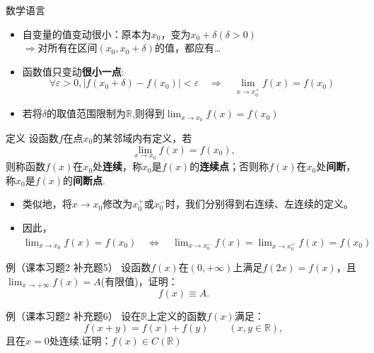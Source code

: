\documentclass[]{beamer}
\begin{document}
\begin{frame}{数学语言}
    \begin{itemize}
        \item 自变量的值变动很小：原本为$x_0$，变为$x_0+\delta(\delta>0)$\\ $\Rightarrow \text{对所有在区间}(x_0,x_0+\delta)$的值，都应有\dots
        \item 函数值只变动\textbf{很小一点}:
        \[
        \forall \varepsilon>0, |f(x_0+\delta)-f(x_0)|<\varepsilon\quad\Rightarrow\quad\lim_{x\rightarrow x_0^+}f(x)=f(x_0)
        \]
        \item 若将$\delta$的取值范围限制为$\mathbb R$,则得到$\displaystyle\lim_{x\rightarrow x_0}f(x)=f(x_0)$
    \end{itemize}
\end{frame}

\begin{frame}{定义}
    设函数$f$在点$x_0$的某邻域内有定义，若
    \[
    \lim_{x\rightarrow x_0}f(x)=f(x_0),
    \]
    则称函数$f(x)$在$x_0$处\textbf{连续}，称$x_0$是$f(x)$的\textbf{连续点}；否则称$f(x)$在$x_0$处\textbf{间断}，称$x_0$是$f(x)$的\textbf{间断点}.

    \begin{itemize}
        \item 类似地，将$x\rightarrow x_0$修改为$x_0^+$或$x_0^-$时，我们分别得到右连续、左连续的定义。
        \item 因此，$\displaystyle\lim_{x\rightarrow x_0}f(x)=f(x_0) \quad\Leftrightarrow\quad \lim_{x\rightarrow x_0^-}f(x)=\lim_{x\rightarrow x_0^+}f(x)=f(x_0)$
    \end{itemize}
\end{frame}

\begin{frame}{例（课本习题2 补充题5）}
    设函数$f(x)$在$(0,+\infty)$上满足$f(2x)=f(x)$，且$\displaystyle\lim_{x\rightarrow+\infty}f(x)=A$(有限值)，证明：
    \[
    f(x)\equiv A.
    \]
    
\end{frame}

\begin{frame}{例（课本习题2 补充题6）}
    设在$\mathbb R$上定义的函数$f(x)$满足：
    \[
    f(x+y)=f(x)+f(y)\qquad(x,y\in\mathbb R),
    \]
    且在$x=0$处连续.证明：$f(x)\in C(\mathbb R)$
\end{frame}
\end{document}
